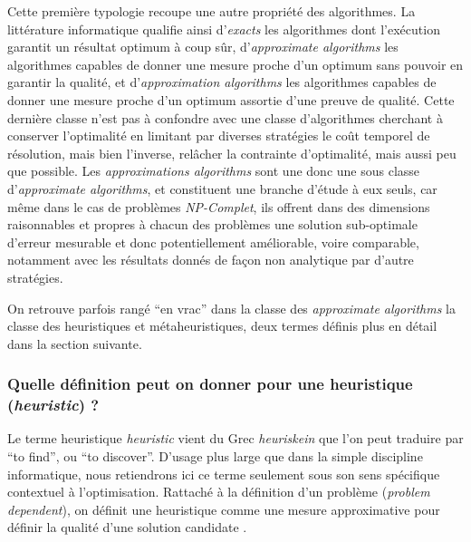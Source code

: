 Cette première typologie recoupe une autre propriété des algorithmes. La littérature informatique qualifie ainsi d'\textit{exacts} les algorithmes dont l'exécution garantit un résultat optimum à coup sûr, d'\textit{approximate algorithms} les algorithmes capables de donner une mesure proche d'un optimum sans pouvoir en garantir la qualité, et d'\textit{approximation algorithms} les algorithmes capables de donner une mesure proche d'un optimum assortie d'une preuve de qualité. Cette dernière classe n'est pas à confondre avec une classe d'algorithmes cherchant à conserver l'optimalité en limitant par diverses stratégies le coût temporel de résolution, mais bien l'inverse, relâcher la contrainte d'optimalité, mais aussi peu que possible. Les \textit{approximations algorithms} sont une donc une sous classe d'\textit{approximate algorithms}, et constituent une branche d'étude à eux seuls, car même dans le cas de problèmes \textit{NP-Complet}, ils offrent dans des dimensions raisonnables et propres à chacun des problèmes une solution sub-optimale d'erreur mesurable et donc potentiellement améliorable, voire comparable, notamment avec les résultats donnés de façon non analytique par d'autre stratégies.

On retrouve parfois rangé \enquote{en vrac} dans la classe des \textit{approximate algorithms} la classe des heuristiques et métaheuristiques, deux termes définis plus en détail dans la section suivante.


\subsubsection{Quelle définition peut on donner pour une heuristique (\textit{heuristic}) ? }
\label{sssec:heuristique}

Le terme heuristique \textit{heuristic} vient du Grec \textit{heuriskein} que l'on peut traduire par \foreignquote{english}{to find}, ou \foreignquote{english}{to discover}. D'usage plus large que dans la simple discipline informatique, nous retiendrons ici ce terme seulement sous son sens spécifique contextuel à l'optimisation. Rattaché à la définition d'un problème (\textit{problem dependent}), on définit une heuristique comme une mesure approximative pour définir la qualité d'une solution candidate \autocite[34]{Weise2011}.


